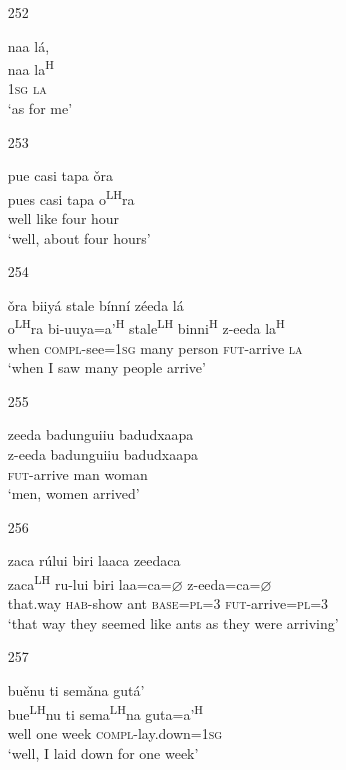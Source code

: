 \begin{itemize}
\item[252]
 
\glll   naa l\'{a}, \\
 naa la\textsuperscript{H}\\
 \textsc{1sg} \textsc{la}\\
\glt `as for me'
 


\item[253]
 
\glll   pue casi tapa \v{o}ra  \\
pues casi tapa o\textsuperscript{LH}ra\\
 well like four hour\\
\glt `well, about four hours'
 


\item[254]
 
\glll   \v{o}ra biiy\'{a} stale b\'{i}nn\'{i} z\'{e}eda l\'{a}\\
o\textsuperscript{LH}ra bi-uuya=a'\textsuperscript{H} stale\textsuperscript{LH} binni\textsuperscript{H} z-eeda la\textsuperscript{H}\\
when \textsc{compl}-see=\textsc{1sg} many person \textsc{fut}-arrive \textsc{la}\\
\glt `when I saw many people arrive'
 


\item[255]
 
\glll   zeeda badunguiiu badudxaapa\\
z-eeda badunguiiu badudxaapa\\
\textsc{fut}-arrive man woman\\
\glt `men, women arrived' 
 


\item[256]
 
\glll   zaca r\'{u}lui biri laaca zeedaca\\
zaca\textsuperscript{LH} ru-lui biri laa=ca=$\varnothing$ z-eeda=ca=$\varnothing$\\
that.way \textsc{hab}-show ant \textsc{base}=\textsc{pl}=\textsc{3} \textsc{fut}-arrive=\textsc{pl}=\textsc{3}\\
\glt `that way they seemed like ants as they were arriving'
 


\item[257]
 
\glll   bu\v{e}nu ti sem\v{a}na gut\'{a}'\\
 bue\textsuperscript{LH}nu ti sema\textsuperscript{LH}na guta=a'\textsuperscript{H}\\
 well one week \textsc{compl}-lay.down=\textsc{1sg}\\
\glt `well, I laid down for one week'
 


\end{itemize}
